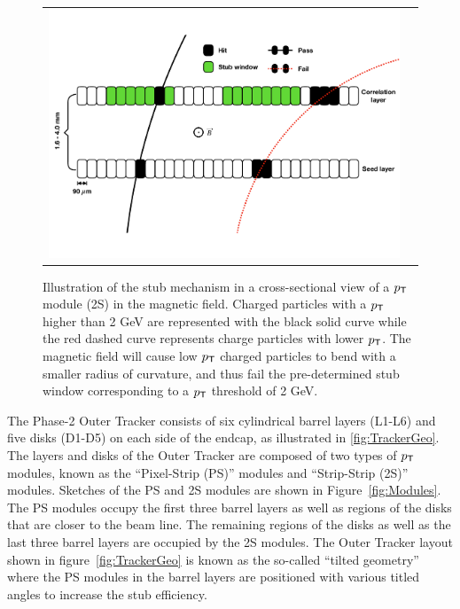 \begin{figure}[tbh!]
 \begin{center}
 \begin{tabular}{cc}
  \centering\includegraphics[width=0.9\linewidth]{figures/Part2/Upgrade/Stub}
 \end{tabular}
 \caption{Illustration of the stub mechanism in a cross-sectional view of a $p_{\textsf{T}}$ module (2S) in the magnetic field. Charged particles with a $p_{\textsf{T}}$ higher than 2 GeV are represented with the black solid curve while the red dashed curve represents charge particles with lower $p_{\textsf{T}}$. The magnetic field will cause low $p_{\textsf{T}}$ charged particles to bend with a smaller radius of curvature, and thus fail the pre-determined stub window corresponding to a $p_{\textsf{T}}$ threshold of 2 GeV.}
 \label{fig:Stub}
 \end{center}
\end{figure}

The Phase-2 Outer Tracker consists of six cylindrical barrel layers (L1-L6) and five disks (D1-D5) on each side of the endcap, as illustrated in \ref{fig:TrackerGeo}. The layers and disks of the Outer Tracker are composed of two types of $p_{\textsf{T}}$ modules, known as the ``Pixel-Strip (PS)'' modules and ``Strip-Strip (2S)'' modules. Sketches of the PS and 2S modules are shown in Figure~\ref{fig:Modules}. The PS modules occupy the first three barrel layers as well as regions of the disks that are closer to the beam line. The remaining regions of the disks as well as the last three barrel layers are occupied by the 2S modules. The Outer Tracker layout shown in figure~\ref{fig:TrackerGeo} is known as the so-called ``tilted geometry'' where the PS modules in the barrel layers are positioned with various titled angles to increase the stub efficiency.

